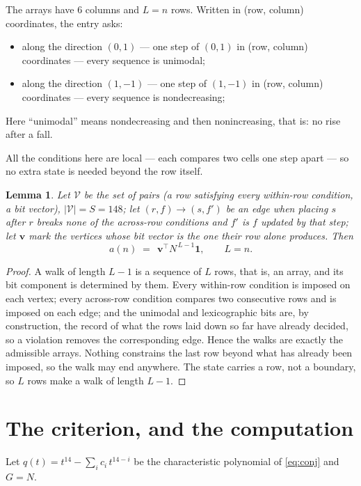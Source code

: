 \documentclass[11pt,a4paper]{article}
\theoremstyle{plain}
\newtheorem{lemma}[theorem]{Lemma}
\theoremstyle{definition}
\begin{document}
The arrays have $6$ columns and $L=n$ rows. Written in (row, column)
coordinates, the entry asks:
\begin{itemize}
\item along the direction $(0,1)$ --- one step of $(0,1)$ in (row, column) coordinates --- every sequence is unimodal;
\item along the direction $(1,-1)$ --- one step of $(1,-1)$ in (row, column) coordinates --- every sequence is nondecreasing;
\end{itemize}
Here ``unimodal'' means nondecreasing and then nonincreasing, that is: no rise after a fall.

All the conditions here are local --- each compares two cells one step apart ---
so no extra state is needed beyond the row itself.

\begin{lemma}\label{lem:walk}
Let $\mathcal V$ be the set of pairs (a row satisfying every within-row condition, a
bit vector), $|\mathcal V|=S=148$; let $(r,f)\to(s,f')$ be an edge when placing $s$ after $r$
breaks none of the across-row conditions and $f'$ is $f$ updated by that step; let
$\mathbf{v}$ mark the vertices whose bit vector is the one their row alone produces.
Then
\[
a(n)\;=\;\,\mathbf{v}^{\!\top}N^{\,L-1}\mathbf{1},\qquad L=n.
\]
\end{lemma}

\begin{proof}
A walk of length $L-1$ is a sequence of $L$ rows, that is, an array, and its bit component
is determined by them. Every within-row condition is imposed on each vertex; every
across-row condition compares two consecutive rows and is imposed on each edge; and the
unimodal and lexicographic bits are, by construction, the record of what the rows laid down
so far have already decided, so a violation removes the corresponding edge. Hence the walks
are exactly the admissible arrays. Nothing constrains the last row beyond what has already
been imposed, so the walk may end anywhere. The state carries a row, not a boundary, so
$L$ rows make a walk of length $L-1$.
\end{proof}

\section{The criterion, and the computation}

Let $q(t)=t^{14}-\sum_i c_i\,t^{14-i}$ be the characteristic polynomial of
\eqref{eq:conj} and $G=N$.
\end{document}
